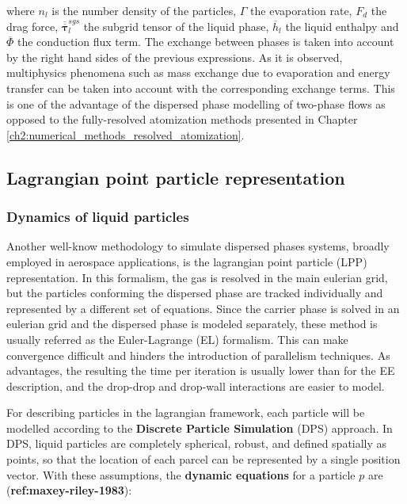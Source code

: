 where $n_l$ is the number density of the particles, $\Gamma$ the evaporation rate, $F_{d}$ the drag force, $\overline{\overline{\pmb{\tau}}}_l^{sgs}$ the subgrid tensor of the liquid phase, $\overline{h}_l$ the liquid enthalpy and $\overline{\Phi}$ the conduction flux term. The exchange between phases is taken into account by the right hand sides of the previous expressions. As it is observed, multiphysics phenomena such as mass exchange due to evaporation and energy transfer can be taken into account with the corresponding exchange terms.  This is one of the advantage of the dispersed phase modelling of two-phase flows as opposed to the fully-resolved atomization methods presented in Chapter \ref{ch2:numerical_methods_resolved_atomization}. 

\subsection{Lagrangian point particle representation}
\label{sec:ch3_EL_formalisms}

\subsubsection*{Dynamics of liquid particles}

Another well-know methodology to simulate dispersed phases systems, broadly employed in aerospace applications, is the lagrangian point particle (LPP) representation. In this formalism, the gas is resolved in the main eulerian grid, but the particles conforming the dispersed phase are tracked individually and represented by a different set of equations. Since the carrier phase is solved in an eulerian grid and the dispersed phase is modeled separately, these method is usually referred as the Euler-Lagrange (EL) formalism. This can make convergence difficult and hinders the introduction of parallelism techniques. As advantages, the resulting the time per iteration is usually lower than for the EE description, and the drop-drop and drop-wall interactions are easier to model.

For describing particles in the lagrangian framework, each particle will be modelled according to the \textbf{Discrete Particle Simulation} (DPS) approach. In DPS, liquid particles are completely spherical, robust, and defined spatially as points, so that the location of each parcel can be represented by a single position vector. With these assumptions, the \textbf{dynamic equations} for a particle $p$ are (\textbf{ref:maxey-riley-1983}):

